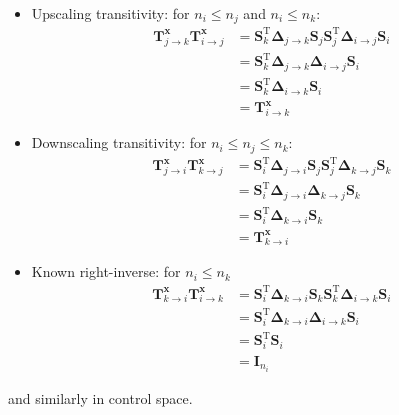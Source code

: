 \documentclass[12pt]{scrartcl}
\begin{document}
\begin{itemize}
\item Upscaling transitivity: for $n_i \le n_j$ and $n_i \le n_k$:
\begin{align}
\mathbf{T}^\mathbf{x}_{j \rightarrow k} \mathbf{T}^\mathbf{x}_{i \rightarrow j} & = \mathbf{S}^\mathrm{T}_k \boldsymbol{\Delta}_{j \rightarrow k} \mathbf{S}_j \mathbf{S}^\mathrm{T}_j  \boldsymbol{\Delta}_{i \rightarrow j} \mathbf{S}_i \nonumber \\
& = \mathbf{S}^\mathrm{T}_k \boldsymbol{\Delta}_{j \rightarrow k} \boldsymbol{\Delta}_{i \rightarrow j} \mathbf{S}_i \nonumber \\
& = \mathbf{S}^\mathrm{T}_k \boldsymbol{\Delta}_{i \rightarrow k} \mathbf{S}_i \nonumber \\
& = \mathbf{T}^\mathbf{x}_{i \rightarrow k}
\end{align}
\item Downscaling transitivity: for $n_i \le n_j \le n_k$:
\begin{align}
\mathbf{T}^\mathbf{x}_{j \rightarrow i} \mathbf{T}^\mathbf{x}_{k \rightarrow j} & = \mathbf{S}^\mathrm{T}_i \boldsymbol{\Delta}_{j \rightarrow i} \mathbf{S}_j \mathbf{S}^\mathrm{T}_j \boldsymbol{\Delta}_{k \rightarrow j} \mathbf{S}_k \nonumber \\
& = \mathbf{S}^\mathrm{T}_i \boldsymbol{\Delta}_{j \rightarrow i} \boldsymbol{\Delta}_{k \rightarrow j} \mathbf{S}_k \nonumber \\
& = \mathbf{S}^\mathrm{T}_i \boldsymbol{\Delta}_{k \rightarrow i} \mathbf{S}_k \nonumber \\
& = \mathbf{T}^\mathbf{x}_{k \rightarrow i}
\end{align}
\item Known right-inverse: for $n_i \le n_k$
\begin{align}
\mathbf{T}^\mathbf{x}_{k \rightarrow i} \mathbf{T}^\mathbf{x}_{i \rightarrow k} & = \mathbf{S}^\mathrm{T}_i \boldsymbol{\Delta}_{k \rightarrow i} \mathbf{S}_k \mathbf{S}^\mathrm{T}_k \boldsymbol{\Delta}_{i \rightarrow k} \mathbf{S}_i \nonumber \\
& = \mathbf{S}^\mathrm{T}_i \boldsymbol{\Delta}_{k \rightarrow i} \boldsymbol{\Delta}_{i \rightarrow k} \mathbf{S}_i \nonumber \\
& = \mathbf{S}^\mathrm{T}_i \mathbf{S}_i \nonumber \\
& = \mathbf{I}_{n_i}
\end{align}
\end{itemize}
and similarly in control space.
\end{document}
